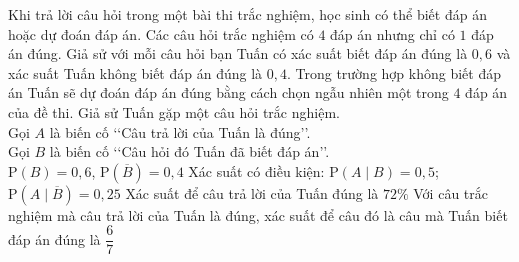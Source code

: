\begin{ex}%
	Khi trả lời câu hỏi trong một bài thi trắc nghiệm, học sinh có thể biết đáp án hoặc dự đoán đáp án. Các câu hỏi trắc nghiệm có $4$ đáp án nhưng chỉ có $1$ đáp án đúng. Giả sử với mỗi câu hỏi bạn Tuấn có xác suất biết đáp án đúng là $0{,}6$ và xác suất Tuấn không biết đáp án đúng là $0{,}4$. Trong trường hợp không biết đáp án Tuấn sẽ dự đoán đáp án đúng bằng cách chọn ngẫu nhiên một trong $4$ đáp án của đề thi. Giả sử Tuấn gặp một câu hỏi trắc nghiệm.\\
	Gọi $A$ là biến cố \lq\lq Câu trả lời của Tuấn là đúng\rq\rq.\\
	Gọi $B$ là biến cố \lq\lq Câu hỏi đó Tuấn đã biết đáp án\rq\rq.\\
	\choiceTF
	{\True $\mathrm{P}(B)=0{,}6$, $\mathrm{P}\left(\overline{B} \right)=0{,}4$}
	{Xác suất có điều kiện: $\mathrm{P}(A\mid B)=0{,}5$; $\mathrm{P}\left( A\mid\overline{B}\right)=0{,}25 $}
	{Xác suất để câu trả lời của Tuấn đúng là $72\%$}
	{\True Với câu trắc nghiệm mà câu trả lời của Tuấn là đúng, xác suất để câu đó là câu mà Tuấn biết đáp án đúng là $\dfrac{6}{7}$}
\end{ex}

